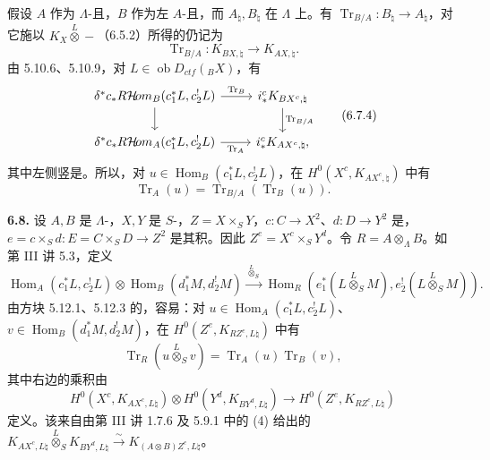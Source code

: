 假设 $A$ 作为 $\Lambda$-且，$B$ 作为左 $A$-且，而 $A_\natural,B_\natural$ 在 $\Lambda$ 上。有 $\operatorname{Tr}_{B/A}:B_\natural\to A_\natural$，对它施以 $K_X\overset L\otimes-$（6.5.2）所得的仍记为
\begin{equation}\operatorname{Tr}_{B/A}:K_{BX,\natural}\longrightarrow K_{AX,\natural}.\tag{6.7.3}\end{equation}
由 5.10.6、5.10.9，对 $L\in\operatorname{ob}D_{ctf}({}_BX)$，有
\begin{equation}\begin{tikzcd}
\delta^*c_*R\mathcal H\!om_B(c_1^*L,c_2^!L)\arrow[r,"\operatorname{Tr}_B"]\arrow[d]&i_*^cK_{BX^c,\natural}\arrow[d,"\operatorname{Tr}_{B/A}"]\\
\delta^*c_*R\mathcal H\!om_A(c_1^*L,c_2^!L)\arrow[r,"\operatorname{Tr}_A"']&i_*^cK_{AX^c,\natural},
\end{tikzcd}\tag{6.7.4}\end{equation}
其中左侧竖是。所以，对 $u\in\operatorname{Hom}_B(c_1^*L,c_2^!L)$，在 $H^0(X^c,K_{AX^c,\natural})$ 中有
\begin{equation}\operatorname{Tr}_A(u)=\operatorname{Tr}_{B/A}(\operatorname{Tr}_B(u)).\tag{6.7.5}\end{equation}

\textbf{6.8.} 设 $A,B$ 是 $\Lambda$-，$X,Y$ 是 $S$-，$Z=X\times_SY$，$c:C\to X^2$、$d:D\to Y^2$ 是，$e=c\times_Sd:E=C\times_SD\to Z^2$ 是其积。因此 $Z^e=X^c\times_SY^d$。令 $R=A\otimes_\Lambda B$。如第 III 讲 5.3，定义
\begin{equation}\operatorname{Hom}_A(c_1^*L,c_2^!L)\otimes\operatorname{Hom}_B(d_1^*M,d_2^!M)\xrightarrow{\ \overset L\otimes_S\ }\operatorname{Hom}_R(e_1^*(L\overset L\otimes_SM),e_2^!(L\overset L\otimes_SM)).\tag{6.8.1}\end{equation}
由方块 5.12.1、5.12.3 的，容易：对 $u\in\operatorname{Hom}_A(c_1^*L,c_2^!L)$、$v\in\operatorname{Hom}_B(d_1^*M,d_2^!M)$，在 $H^0(Z^e,K_{RZ^e,L\natural})$ 中有
\begin{equation}\operatorname{Tr}_R(u\overset L\otimes_Sv)=\operatorname{Tr}_A(u)\operatorname{Tr}_B(v),\tag{6.8.2}\end{equation}
其中右边的乘积由
\begin{equation}H^0(X^c,K_{AX^c,L\natural})\otimes H^0(Y^d,K_{BY^d,L\natural})\longrightarrow H^0(Z^e,K_{RZ^e,L\natural})\tag{6.8.3}\end{equation}
定义。该来自由第 III 讲 1.7.6 及 5.9.1 中的 (4) 给出的 $K_{AX^c,L\natural}\overset L\otimes_SK_{BY^d,L\natural}\xrightarrow\sim K_{(A\otimes B)Z^e,L\natural}$。

